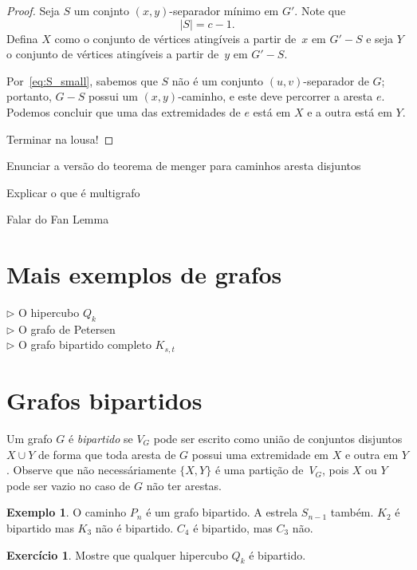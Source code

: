 \documentclass[12pt, a4paper]{article}
\theoremstyle{definition}
\newtheorem{exem}[teor]{Exemplo}
\newtheorem{exer}{Exercício}
\begin{document}
\begin{proof}
Seja $S$ um conjnto $(x,y)$-separador mínimo em $G'$. Note que 
\begin{equation}
  \label{eq:S_small}
  |S| = c - 1.
\end{equation}
 Defina $X$ como o conjunto de vértices atingíveis a partir de~$x$ em $G' - S$ e seja $Y$ o conjunto de vértices atingíveis a partir de~$y$ em $G' - S$.

Por~\eqref{eq:S_small}, sabemos que $S$ não é um conjunto $(u,v)$-separador de $G$; portanto, $G - S$ possui um $(x,y)$-caminho, e este deve percorrer a aresta $e$. Podemos concluir que uma das extremidades de $e$ está em $X$ e a outra está em $Y$.

Terminar na lousa!
\end{proof}


Enunciar a versão do teorema de menger para caminhos aresta disjuntos


Explicar o que é multigrafo

Falar do Fan Lemma 








\section{Mais exemplos de grafos}

$\rhd$ O hipercubo $Q_k$\\
$\rhd$ O grafo de Petersen\\
$\rhd$ O grafo bipartido completo $K_{s,t}$


\section {Grafos bipartidos}

Um grafo $G$ é \emph{bipartido} se $V_G$ pode ser escrito como união de conjuntos disjuntos $X \cup Y$ de forma que toda aresta de $G$ possui uma extremidade em $X$ e outra em $Y$. Observe que não necessáriamente $\{X,Y\}$ é uma partição de~$V_G$, pois $X$ ou $Y$ pode ser vazio no caso de $G$ não ter arestas.

\begin{exem}
O caminho $P_n$ é um grafo bipartido. A estrela $S_{n-1}$ também. $K_2$ é bipartido mas $K_3$ não é bipartido. $C_4$ é bipartido, mas $C_3$ não.
\end{exem}

\begin{exer}
Mostre que qualquer hipercubo $Q_k$ é bipartido. 
\end{exer}
\end{document}
